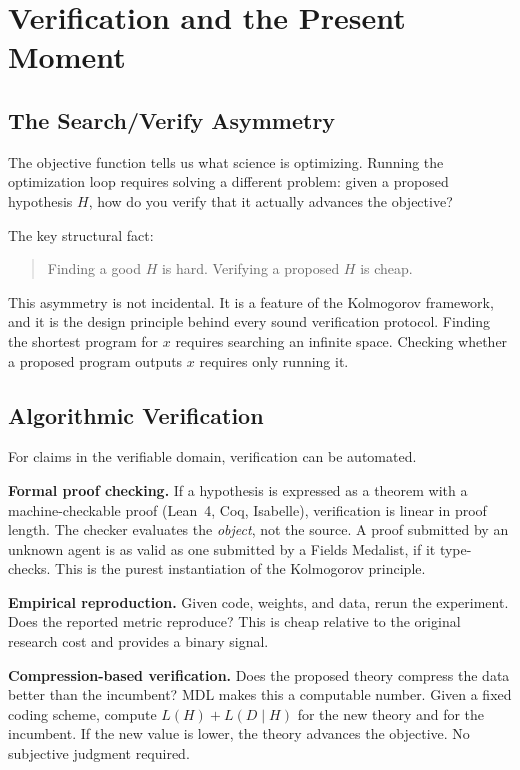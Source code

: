 \section{Verification and the Present Moment}
\label{sec:verification}

\subsection{The Search/Verify Asymmetry}

The objective function tells us what science is optimizing. Running the optimization loop requires solving a different problem: given a proposed hypothesis $H$, how do you verify that it actually advances the objective?

The key structural fact:
\begin{quote}
  Finding a good $H$ is hard. Verifying a proposed $H$ is cheap.
\end{quote}
This asymmetry is not incidental. It is a feature of the Kolmogorov framework, and it is the design principle behind every sound verification protocol. Finding the shortest program for $x$ requires searching an infinite space. Checking whether a proposed program outputs $x$ requires only running it.

\subsection{Algorithmic Verification}

For claims in the verifiable domain, verification can be automated.

\textbf{Formal proof checking.} If a hypothesis is expressed as a theorem with a machine-checkable proof (Lean~4, Coq, Isabelle), verification is linear in proof length. The checker evaluates the \emph{object}, not the source. A proof submitted by an unknown agent is as valid as one submitted by a Fields Medalist, if it type-checks. This is the purest instantiation of the Kolmogorov principle.

\textbf{Empirical reproduction.} Given code, weights, and data, rerun the experiment. Does the reported metric reproduce? This is cheap relative to the original research cost and provides a binary signal.

\textbf{Compression-based verification.} Does the proposed theory compress the data better than the incumbent? MDL makes this a computable number. Given a fixed coding scheme, compute $L(H) + L(D \mid H)$ for the new theory and for the incumbent. If the new value is lower, the theory advances the objective. No subjective judgment required.

